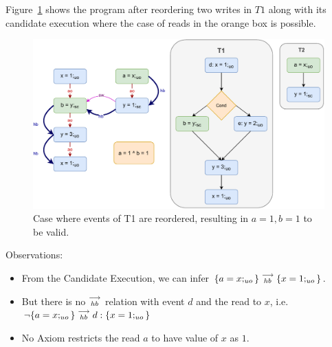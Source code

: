     Figure~\ref{reord:cond_counter_example1(b)} shows the program after reordering two writes in $T1$ along with its candidate execution where the case of reads in the orange box is possible\footnotemark. 
    \begin{figure}[H]
        \centering 
        \includegraphics[scale=0.7]{5.InstructionReordering/5.ValidReorderingProgram/CounterExamples1b(Conditionals).pdf}
        \caption{Case where events of T1 are reordered, resulting in $a = 1,  b = 1$ to be valid.}
        \label{reord:cond_counter_example1(b)}
    \end{figure}
    
    Observations:
    \begin{itemize}
        \item From the Candidate Execution, we can infer $\{a=x;_{uo}\}\stackrel{\longrightarrow}{_{hb}}\{x=1;_{uo}\}$. 
        \item But there is no $\stackrel{\longrightarrow}{_{hb}}$ relation with event $d$ and the read to $x$, i.e. $\neg \{a=x;_{uo}\}\stackrel{\longrightarrow}{_{hb}}d:\{x=1;_{uo}\}$
        \item No Axiom restricts the read $a$ to have value of $x$ as $1$.
    \end{itemize}
    
